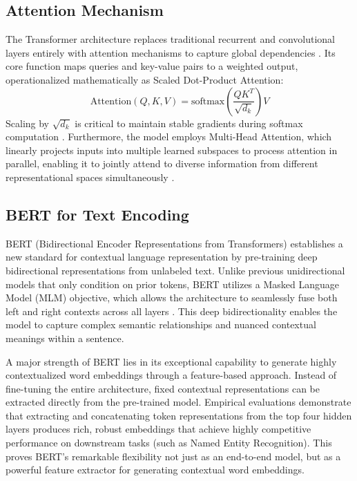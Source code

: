 \documentclass[conference]{IEEEtran}
\begin{document}
\subsection{Attention Mechanism}
The Transformer architecture replaces traditional recurrent and convolutional layers entirely with attention mechanisms to capture global dependencies \cite{vaswani2017}. Its core function maps queries and key-value pairs to a weighted output, operationalized mathematically as Scaled Dot-Product Attention:
\begin{equation}
    \text{Attention}(Q, K, V) = \text{softmax}\left(\frac{QK^T}{\sqrt{d_k}}\right)V
\end{equation}
Scaling by $\sqrt{d_k}$ is critical to maintain stable gradients during softmax computation \cite{vaswani2017}. Furthermore, the model employs Multi-Head Attention, which linearly projects inputs into multiple learned subspaces to process attention in parallel, enabling it to jointly attend to diverse information from different representational spaces simultaneously \cite{vaswani2017}.

\subsection{BERT for Text Encoding}
BERT (Bidirectional Encoder Representations from Transformers) establishes a new standard for contextual language representation by pre-training deep bidirectional representations from unlabeled text. Unlike previous unidirectional models that only condition on prior tokens, BERT utilizes a Masked Language Model (MLM) objective, which allows the architecture to seamlessly fuse both left and right contexts across all layers \cite{devlin2019}. This deep bidirectionality enables the model to capture complex semantic relationships and nuanced contextual meanings within a sentence.

A major strength of BERT lies in its exceptional capability to generate highly contextualized word embeddings through a feature-based approach. Instead of fine-tuning the entire architecture, fixed contextual representations can be extracted directly from the pre-trained model. Empirical evaluations demonstrate that extracting and concatenating token representations from the top four hidden layers produces rich, robust embeddings that achieve highly competitive performance on downstream tasks (such as Named Entity Recognition). This proves BERT's remarkable flexibility not just as an end-to-end model, but as a powerful feature extractor for generating contextual word embeddings.
\end{document}
